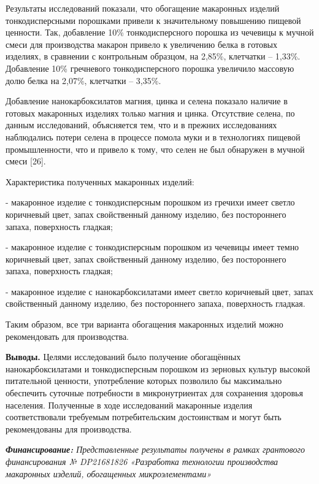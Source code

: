 \begin{multicols}{2}

Результаты исследований показали, что обогащение макаронных изделий
тонкодисперсными порошками привели к значительному повышению пищевой
ценности. Так, добавление 10\% тонкодисперсного порошка из чечевицы к
мучной смеси для производства макарон привело к увеличению белка в
готовых изделиях, в сравнении с контрольным образцом, на 2,85\%,
клетчатки -- 1,33\%. Добавление 10\% гречневого тонкодисперсного порошка
увеличило массовую долю белка на 2,07\%, клетчатки -- 3,35\%.

Добавление нанокарбоксилатов магния, цинка и селена показало наличие в
готовых макаронных изделиях только магния и цинка. Отсутствие селена, по
данным исследований, объясняется тем, что и в прежних исследованиях
наблюдались потери селена в процессе помола муки и в технологиях пищевой
промышленности, что и привело к тому, что селен не был обнаружен в
мучной смеси {[}26{]}.

Характеристика полученных макаронных изделий:

- макаронное изделие с тонкодисперсным порошком из гречихи имеет светло
коричневый цвет, запах свойственный данному изделию, без постороннего
запаха, поверхность гладкая;

- макаронное изделие с тонкодисперсным порошком из чечевицы имеет темно
коричневый цвет, запах свойственный данному изделию, без постороннего
запаха, поверхность гладкая;

- макаронное изделие с нанокарбоксилатами имеет светло коричневый цвет,
запах свойственный данному изделию, без постороннего запаха, поверхность
гладкая.

Таким образом, все три варианта обогащения макаронных изделий можно
рекомендовать для производства.

{\bfseries Выводы.} Целями исследований было получение обогащённых
нанокарбоксилатами и тонкодисперсным порошком из зерновых культур
высокой питательной ценности, употребление которых позволило бы
максимально обеспечить суточные потребности в микронутриентах для
сохранения здоровья населения. Полученные в ходе исследований макаронные
изделия соответствовали требуемым потребительским достоинствам и могут
быть рекомендованы для производства.

\emph{{\bfseries Финансирование:} Представленные результаты получены в
рамках грантового финансирования № DP21681826 «Разработка технологии
производства макаронных изделий, обогащенных микроэлементами»}

\end{multicols}


